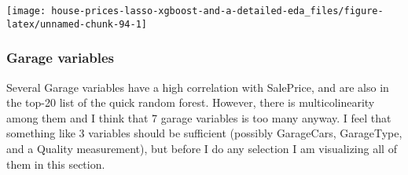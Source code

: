 \documentclass[]{article}
\newenvironment{Shaded}{\begin{snugshade}}{\end{snugshade}}
\newcommand{\DecValTok}[1]{\textcolor[rgb]{0.00,0.00,0.81}{#1}}
\newcommand{\StringTok}[1]{\textcolor[rgb]{0.31,0.60,0.02}{#1}}
\newcommand{\CommentTok}[1]{\textcolor[rgb]{0.56,0.35,0.01}{\textit{#1}}}
\newcommand{\OperatorTok}[1]{\textcolor[rgb]{0.81,0.36,0.00}{\textbf{#1}}}
\newcommand{\NormalTok}[1]{#1}
\begin{document}
\texttt{[image: house-prices-lasso-xgboost-and-a-detailed-eda\_files/figure-latex/unnamed-chunk-94-1]}

\subsubsection{Garage variables}\label{garage-variables-1}

Several Garage variables have a high correlation with SalePrice, and are
also in the top-20 list of the quick random forest. However, there is
multicolinearity among them and I think that 7 garage variables is too
many anyway. I feel that something like 3 variables should be sufficient
(possibly GarageCars, GarageType, and a Quality measurement), but before
I do any selection I am visualizing all of them in this section.

\begin{Shaded}
\end{Shaded}
\end{document}
